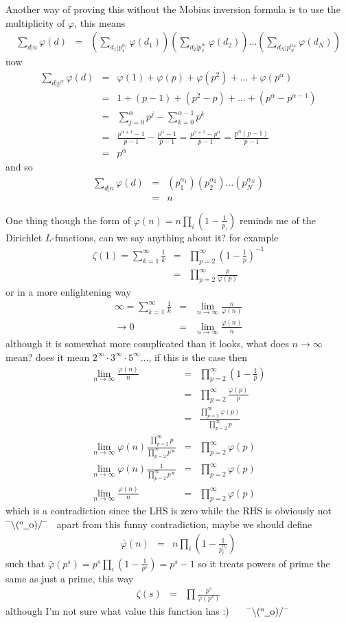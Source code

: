 \documentclass[aps,preprint,preprintnumbers,nofootinbib,showpacs,prd]{revtex4-1}
\newcommand{\nbea}{\begin{eqnarray*}}
\newcommand{\neea}{\end{eqnarray*}}
\newcommand{\dunno}{$ {}^{\mbox {--}}\backslash(^{\rm o}{}\underline{\hspace{0.2cm}}{\rm o})/^{\mbox {--}}$}
\begin{document}
Another way of proving this without the Mobius inversion formula is to use the multiplicity of $\varphi$, this means
%
\nbea
\sum_{d|n} \varphi(d) & = & \left(\sum_{d_1|p_1^{\alpha_1}}\varphi(d_1)\right)\left(\sum_{d_2|p_2^{\alpha_i}}\varphi(d_2)\right) \ldots \left(\sum_{d_N|p_N^{\alpha_N}}\varphi(d_N)\right)
\neea
%
now
%
\nbea
\sum_{d|p^{\alpha}}\varphi(d) & = & \varphi(1) + \varphi(p) + \varphi(p^2) + \ldots + \varphi(p^\alpha) \\
& = & 1 + (p-1) + (p^2 - p) + \ldots + (p^\alpha - p^{\alpha-1}) \\
& = & \sum_{j=0}^\alpha p^j - \sum_{k=0}^{\alpha-1}p^k \\
& = & \frac{p^{\alpha+1}-1}{p-1} - \frac{p^{\alpha}-1}{p-1} = \frac{p^{\alpha+1}-p^\alpha}{p-1} = \frac{p^{\alpha}(p-1)}{p-1}\\
& = & p^\alpha
\neea
%
and so
%
\nbea
\sum_{d|n} \varphi(d) & = & \left(p_1^{\alpha_1}\right)\left(p_2^{\alpha_2}\right) \ldots \left(p_N^{\alpha_N}\right) \\
& = & n
\neea
%


One thing though the form of $\varphi(n) = n\prod_i\left(1 - \frac{1}{p_i}\right)$ reminds me of the Dirichlet $L$-functions, can we say anything about it? for example
%
\nbea
\zeta(1) = \sum_{k=1}^\infty \frac{1}{k} & = & \prod_{p=2}^\infty\left(1-\frac{1}{p}\right)^{-1} \\
& = & \prod_{p=2}^\infty \frac{p}{\varphi(p)}
\neea
%
or in a more enlightening way
%
\nbea
\infty = \sum_{k=1}^\infty \frac{1}{k} & = & \lim_{n\to\infty} \frac{n}{\varphi(n)} \\
\to 0 & = & \lim_{n\to\infty}\frac{\varphi(n)}{n}
\neea
%
although it is somewhat more complicated than it looks, what does $n\to\infty$ mean? does it mean $2^\infty\cdot 3^\infty\cdot 5^\infty\ldots$, if this is the case then
%
\nbea
\lim_{n\to\infty}\frac{\varphi(n)}{n} & = & \prod_{p=2}^\infty \left(1-\frac{1}{p}\right) \\
& = & \prod_{p=2}^\infty \frac{\varphi(p)}{p} \\
& = & \frac{\prod_{p=2}^\infty \varphi(p)}{\prod_{p=2}^\infty p} \\
\lim_{n\to\infty} \varphi(n) \frac{\prod_{p=2}^\infty p}{\prod_{p=2}^\infty p^\infty} & = & \prod_{p=2}^\infty \varphi(p) \\
\lim_{n\to\infty} \varphi(n) \frac{1}{\prod_{p=2}^\infty p^\infty} & = & \prod_{p=2}^\infty \varphi(p) \\
\lim_{n\to\infty}\frac{\varphi(n)}{n} & = & \prod_{p=2}^\infty \varphi(p)
\neea
%
which is a contradiction since the LHS is zero while the RHS is obviously not ~\dunno~ apart from this funny contradiction, maybe we should define
%
\nbea
\bar\varphi(n) & = & n\prod_i\left(1-\frac{1}{p_i^{\alpha_i}}\right)
\neea
%
such that $\bar\varphi(p^s) =p^s\prod_i\left(1-\frac{1}{p^{s}}\right) = p^s-1$ so it treats powers of prime the same as just a prime, this way
%
\nbea
\zeta(s) & = & \prod \frac{p^s}{\bar\varphi(p^s)}
\neea
%
although I'm not sure what value this function has :) ~~~\dunno
\end{document}
